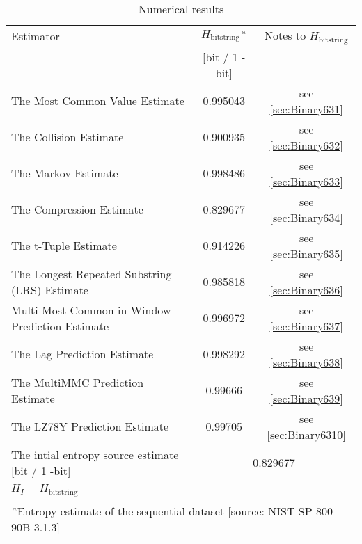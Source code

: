 \documentclass[a3paper,xelatex,english]{bxjsarticle}
\begin{document}
\begin{table}[h]
\caption{Numerical results}
\begin{center}
\begin{tabular}{|l|c|c|}
\hline 
\rowcolor{anotherlightblue} %
Estimator										& $H_{\textrm{bitstring}}$$^{\textrm{\,a}}$ & Notes to $H_{\textrm{bitstring}}$	\\ 
\cline{2-3}
\rowcolor{anotherlightblue} %
\,												& [bit / 1 - bit] & \,		\\
\hline 
The Most Common Value Estimate					& 0.995043& see \ref{sec:Binary631} \\
\hline 
The Collision Estimate							& 0.900935& see \ref{sec:Binary632} \\
\hline 
The Markov Estimate								& 0.998486& see \ref{sec:Binary633} \\
\hline 
The Compression Estimate						& 0.829677& see \ref{sec:Binary634} \\
\hline 
The t-Tuple Estimate							& 0.914226& see \ref{sec:Binary635} \\
\hline 
The Longest Repeated Substring (LRS) Estimate	& 0.985818& see \ref{sec:Binary636} \\
\hline 
Multi Most Common in Window Prediction Estimate	& 0.996972& see \ref{sec:Binary637} \\
\hline 
The Lag Prediction Estimate						& 0.998292& see \ref{sec:Binary638} \\
\hline 
The MultiMMC Prediction Estimate				& 0.99666& see \ref{sec:Binary639} \\
\hline 
The LZ78Y Prediction Estimate					& 0.99705& see \ref{sec:Binary6310} \\
\hline \hline 
The intial entropy source estimate [bit / 1 -bit]	& \multicolumn{2}{|c|}{0.829677}	\\
$H_{I} = H_{\textrm{bitstring}}$ & \multicolumn{2}{|c|}{ \, } 	\\
\hline \hline 
\multicolumn{3}{|l|}{$^{\,a}$\quad Entropy estimate of the sequential dataset [source: NIST SP 800-90B \cite{SP80090B} 3.1.3]} \\
\hline 
\end{tabular}
\end{center}
\end{table}
\end{document}
